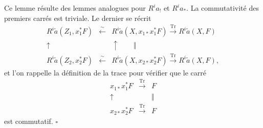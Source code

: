 \documentclass[10pt]{article}
\newcommand{\Tr}{\operatorname{Tr}}
\newcommand{\QED}{\hfill$\square$}
\begin{document}
Ce lemme résulte des lemmes analogues pour $R^ia_!$ et $R^ia_*$. La commutativité des premiers carrés est triviale. Le dernier se récrit
\[
\begin{array}{ccc}
R^i\widetilde a(Z_1,x_1^*F)&\xleftarrow{\sim}&R^i\widetilde a(X,x_{1*}x_1^*F)\xrightarrow{\Tr}R^i\widetilde a(X,F)\\
\uparrow&&\uparrow\qquad\Vert\\
R^i\widetilde a(Z_2,x_2^*F)&\xleftarrow{\sim}&R^i\widetilde a(X,x_{2*}x_2^*F)\xrightarrow{\Tr}R^i\widetilde a(X,F),
\end{array}
\]
et l'on rappelle la définition de la trace pour vérifier que le carré
\[
\begin{array}{ccc}
x_{1*}x_1^*F&\xrightarrow{\Tr}&F\\
\uparrow&&\Vert\\
x_{2*}x_2^*F&\xrightarrow{\Tr}&F
\end{array}
\]
est commutatif. \QED
\end{document}
